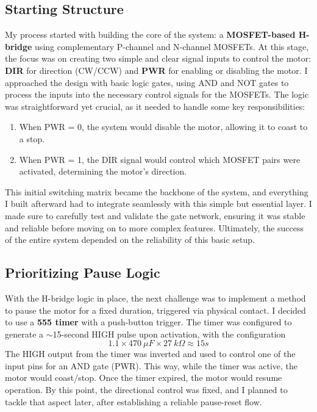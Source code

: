 \documentclass{article}
\begin{document}
\subsection{Starting Structure}
My process started with building the core of the system: a \textbf{MOSFET-based H-bridge} using complementary P-channel and N-channel MOSFETs. At this stage, the focus was on creating two simple and clear signal inputs to control the motor: \textbf{DIR} for direction (CW/CCW) and \textbf{PWR} for enabling or disabling the motor. I approached the design with basic logic gates, using {AND} and {NOT} gates to process the inputs into the necessary control signals for the MOSFETs. The logic was straightforward yet crucial, as it needed to handle some key responsibilities:
\begin{enumerate}[itemsep=-1mm]
	\item When {PWR = 0}, the system would disable the motor, allowing it to coast to a stop.
	\item When {PWR = 1}, the {DIR} signal would control which MOSFET pairs were activated, determining the motor’s direction.
\end{enumerate}
This initial switching matrix became the backbone of the system, and everything I built afterward had to integrate seamlessly with this simple but essential layer. I made sure to carefully test and validate the gate network, ensuring it was stable and reliable before moving on to more complex features. Ultimately, the success of the entire system depended on the reliability of this basic setup.

\subsection{Prioritizing Pause Logic}
With the H-bridge logic in place, the next challenge was to implement a method to {pause the motor} for a fixed duration, triggered via physical contact. I decided to use a \textbf{555 timer} with a push-button trigger. The timer was configured to generate a $\sim$15-second HIGH pulse upon activation, with the configuration $$1.1 \times 470\ \mu{F} \times 27\ {k}\Omega\approx 15s$$
The HIGH output from the timer was {inverted} and used to control one of the input pins for an AND gate ({PWR}). This way, while the timer was active, the motor would {coast/stop}. Once the timer expired, the motor would resume operation. By this point, the directional control was fixed, and I planned to tackle that aspect later, after establishing a reliable pause-reset flow.
\end{document}
